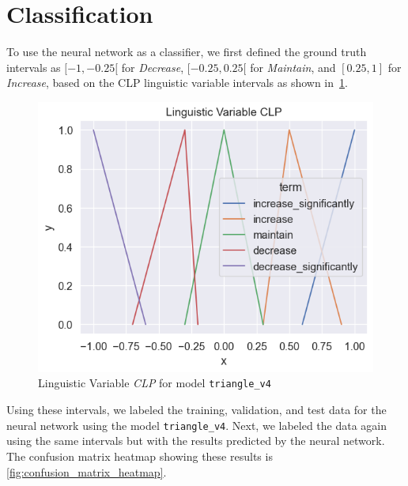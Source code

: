 \documentclass[titlepage]{article}
\begin{document}
\section{Classification}

To use the neural network as a classifier, we first defined the ground truth intervals as \([-1, -0.25[\) for \emph{Decrease}, \([-0.25, 0.25[\) for \emph{Maintain}, and \([0.25, 1]\) for \emph{Increase}, based on the CLP linguistic variable intervals as shown in~\cref{fig:triangle_v4_clp_repeated}.

\begin{figure}[H]
    \centering
    \includegraphics[scale=0.6]{../../fuzzy/output/mamdani_triangular_v4/io_graphs/CLP}
    \caption{Linguistic Variable \emph{CLP} for model \texttt{triangle\_v4}}
    \label{fig:triangle_v4_clp_repeated}
\end{figure}


Using these intervals, we labeled the training, validation, and test data for the neural network using the model \texttt{triangle\_v4}.
Next, we labeled the data again using the same intervals but with the results predicted by the neural network.
The confusion matrix heatmap showing these results is \cref{fig:confusion_matrix_heatmap}.
\end{document}
